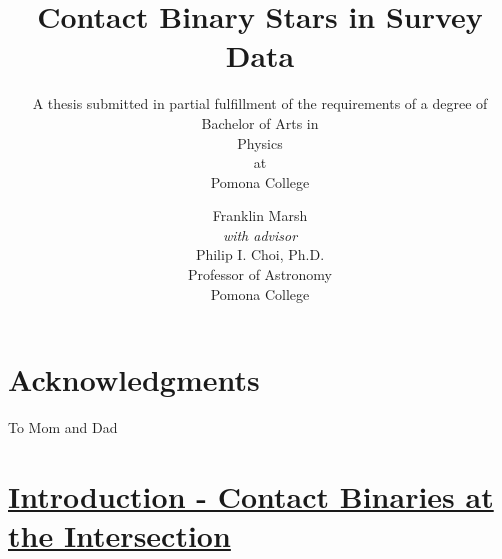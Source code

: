 \documentclass[12pt]{article} %
\title{\textbf{Contact Binary Stars in Survey Data}}
\author{Franklin Marsh\\
\small{\emph{with advisor}}\\
Philip I. Choi, Ph.D.\\
Professor of Astronomy\\ Pomona College}
\subtitle{A thesis submitted in partial fulfillment of the requirements of a degree of Bachelor of Arts
in\\
Physics\\
at\\
Pomona College}
\numberwithin{equation}{section} %
\begin{document}

\maketitle
\thispagestyle{empty}

\newpage

\thispagestyle{empty}
\begin{abstract}

\end{abstract}
\newpage


\thispagestyle{empty}
\section*{Acknowledgments}

To Mom and Dad

\newpage


\tableofcontents %

\newpage %


\section[Introduction - Contact Binaries at the Intersection]{\hyperlink{toc}{Introduction - Contact Binaries at the Intersection}} \label{sec: intro}

\end{document}
